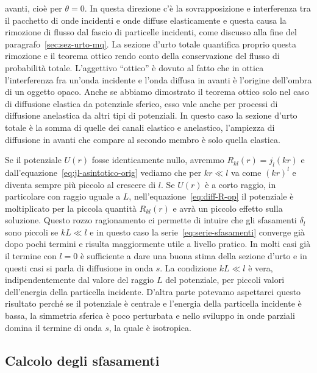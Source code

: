 \documentclass[a4paper,fleqn,twoside,12pt]{article}
\begin{document}
avanti, cioè per $\theta=0$.  In questa direzione c'è la sovrapposizione e
interferenza tra il pacchetto di onde incidenti e onde diffuse elasticamente e
questa causa la rimozione di flusso dal fascio di particelle incidenti, come
discusso alla fine del paragrafo~\ref{sec:sez-urto-mq}.  La sezione d'urto
totale quantifica proprio questa rimozione e il teorema ottico rendo conto della
conservazione del flusso di probabilità totale.  L'aggettivo ``ottico'' è dovuto
al fatto che in ottica l'interferenza fra un'onda incidente e l'onda diffusa in
avanti è l'origine dell'ombra di un oggetto opaco.  Anche se abbiamo dimostrato
il teorema ottico solo nel caso di diffusione elastica da potenziale sferico,
esso vale anche per processi di diffusione anelastica da altri tipi di
potenziali.  In questo caso la sezione d'urto totale è la somma di quelle dei
canali elastico e anelastico, l'ampiezza di diffusione in avanti che compare al
secondo membro è solo quella elastica.

Se il potenziale $U(r)$ fosse identicamente nullo, avremmo
$R_{kl}(r) = j_{l}(kr)$ e dall'equazione~\eqref{eq:jl-asintotico-orig} vediamo
che per $kr \ll l$ va come $(kr)^{l}$ e diventa sempre più piccolo al crescere
di $l$.  Se $U(r)$ è a corto raggio, in particolare con raggio uguale a $L$,
nell'equazione~\eqref{eq:diff-R-op} il potenziale è moltiplicato per la piccola
quantità $R_{kl}(r)$ e avrà un piccolo effetto sulla soluzione.  Questo rozzo
ragionamento ci permette di intuire che gli sfasamenti $\delta_{l}$ sono piccoli
se $kL \ll l$ e in questo caso la serie~\eqref{eq:serie-sfasamenti} converge già
dopo pochi termini e risulta maggiormente utile a livello pratico.  In molti
casi già il termine con $l = 0$ è sufficiente a dare una buona stima della
sezione d'urto e in questi casi si parla di diffusione in onda $s$.  La
condizione $kL \ll l$ è vera, indipendentemente dal valore del raggio $L$ del
potenziale, per piccoli valori dell'energia della particella incidente.  D'altra
parte potevamo aspettarci questo risultato perché se il potenziale è centrale e
l'energia della particella incidente è bassa, la simmetria sferica è poco
perturbata e nello sviluppo in onde parziali domina il termine di onda $s$, la
quale è isotropica.


\subsection{Calcolo degli sfasamenti}
\label{sec:calcolo-sfasamenti}
\end{document}
